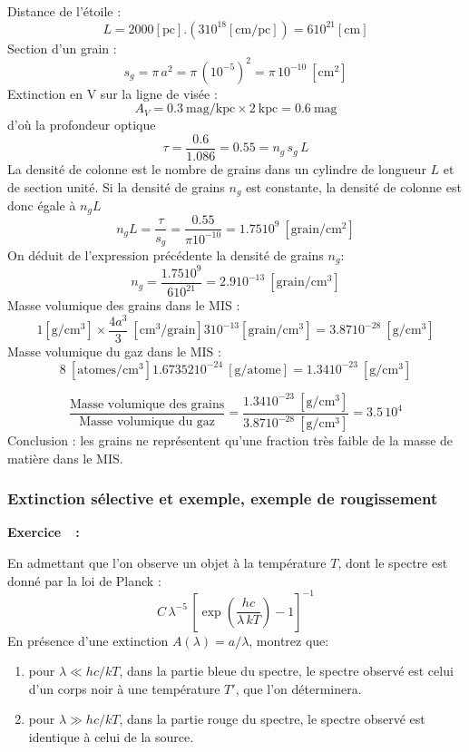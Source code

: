 \documentclass[a4paper,10pt]{report}
\newcounter{noexo}
\newenvironment{Exercise}[1][]{%
  \stepcounter{noexo}
  \medskip\noindent\textbf{Exercice~\thenoexo~:~#1}
  \medskip\par
  \addcontentsline{toc}{paragraph}{Exercice~\thenoexo~:~#1}
}{}
\renewcommand{\u}[1]{\ensuremath{\mathrm{#1}}} %
\begin{document}
\begin{Answer}
  Distance de l'étoile :
  $$
  L = 2000[\u{pc}] .(3 10^{18} [\u{cm/pc}]) = 6 10^{21} [\u{cm}]
  $$
  Section d'un grain :
  $$
  s_g = \pi\,a^2 = \pi\,(10^{-5})^2 = \pi\,10^{-10}~[\u{cm^{2}}]
  $$
  Extinction en V sur la ligne de visée :
  $$
  A_V = 0.3~\u{mag/kpc}\times 2~\u{kpc} = 0.6~\u{mag}
  $$
  d'où la profondeur optique
  $$
  \tau = \frac{0.6}{1.086} = 0.55 = n_g\,s_g\,L
  $$
  La densité de colonne est le nombre de grains dans un cylindre de
  longueur $L$ et de section unité. Si la densité de grains $n_g$ est
  constante, la densité de colonne est donc égale à $n_g L$
  $$
  n_g L = \frac{\tau}{s_g} = \frac{0.55}{\pi 10^{-10}} = 1.75
  10^9~[\u{grain/cm^2}]
  $$
  On déduit de l'expression précédente la densité de grains $n_g$:
  $$
  n_g = \frac{1.75 10^{9}}{6 10^{21}} = 2.9
  10^{-13}~[\u{grain/cm^{3}}]
  $$
  Masse volumique des grains dans le MIS :
  $$
  1 [\u{g/cm^{3}}]\times \frac{4a^{3}}{3}~[\u{cm^3/grain}] 3 10^{-13}
  [\u{grain/cm^3}]= 3.87 10^{-28}~[\u{g/cm^3}]
  $$
  Masse volumique du gaz dans le MIS :
  $$
  8~[\u{atomes/cm^3}] 1.67352 10^{-24}~[\u{g/atome}] = 1.34
  10^{-23}~[\u{g/cm^3}]
  $$

  $$
  \frac{\text{Masse volumique des grains}}{\text{Masse volumique du
      gaz}} = \frac{1.34 10^{-23}~[\u{g/cm^3}]}{3.87
    10^{-28}~[\u{g/cm^3}]} = 3.5\,10^4
  $$
  Conclusion : les grains ne représentent qu'une fraction très faible de
  la masse de matière dans le MIS.
\end{Answer}

\subsubsection{Extinction sélective et exemple, exemple de rougissement}

\begin{Exercise}
  En admettant que l'on observe un objet à la température $T$, dont le
  spectre est donné par la loi de Planck :
  $$
  C\,\lambda^{-5}\,\left[\exp\left({\frac{hc}{\lambda\,kT}}\right)-1\right]^{-1}
  $$
  En présence d'une extinction $A(\lambda) = a/\lambda$, montrez que:
  \begin{enumerate}
  \item pour $\lambda \ll hc/kT$, dans la partie bleue du spectre, le
    spectre observé est celui d'un corps noir à une température $T'$,
    que l'on déterminera.
  \item pour $\lambda \gg hc/kT$, dans la partie rouge du spectre, le
    spectre observé est identique à celui de la source.
  \end{enumerate}
\end{Exercise}
\end{document}
